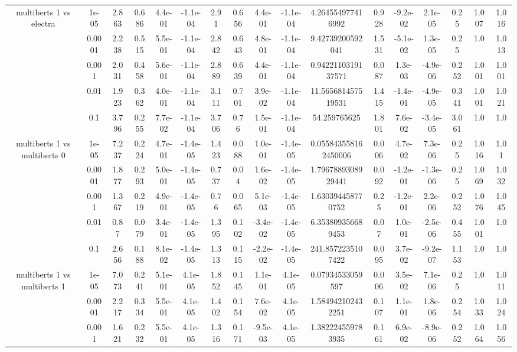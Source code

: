 \begin{tabular}{|c|c|c|c|c|c|c|c|c|c|c|c|c|c|c|c|c|}
\hline
\multirow{5}{*}{multiberts 1 vs electra } & 1e-05 & 2.863 & 0.686 & 4.4e-01 & -1.1e-04 & 2.91 & 0.656 & 4.4e-01 & -1.1e-04 & 4.264554977416992 & 0.928 & -9.2e-02 & 2.1e-05 & 0.25 & 1.007 & 1.016 \\
 & 0.0001 & 2.238 & 0.515 & 5.5e-01 & -1.1e-04 & 2.842 & 0.643 & 4.8e-01 & -1.1e-04 & 9.42739200592041 & 1.531 & -5.1e-02 & 1.3e-05 & 0.25 & 1.0 & 1.013 \\
 & 0.001 & 2.031 & 0.458 & 5.6e-01 & -1.1e-04 & 2.889 & 0.639 & 4.4e-01 & -1.1e-04 & 0.9422110319137571 & 0.087 & 1.3e-03 & -4.9e-06 & 0.252 & 1.001 & 1.001 \\
 & 0.01 & 1.923 & 0.362 & 4.0e-01 & -1.1e-04 & 3.111 & 0.701 & 3.9e-02 & -1.1e-04 & 11.565681457519531 & 1.415 & -1.4e-01 & -4.9e-05 & 0.341 & 1.001 & 1.021 \\
 & 0.1 & 3.796 & 0.255 & 7.7e-02 & -1.1e-04 & 3.706 & 0.76 & 1.5e-01 & -1.1e-04 & 54.259765625 & 1.801 & 7.6e-02 & -3.4e-05 & 3.061 & 1.0 & 1.0 \\
\hline
\multirow{5}{*}{multiberts 1 vs multiberts 0} & 1e-05 & 7.237 & 0.224 & 4.7e-01 & -1.4e-05 & 1.423 & 0.088 & 1.0e-01 & -1.4e-05 & 0.055843558162450006 & 0.006 & 4.7e-02 & 7.3e-06 & 0.25 & 1.016 & 1.01 \\
 & 0.0001 & 1.877 & 0.293 & 5.0e-01 & -1.4e-05 & 0.737 & 0.04 & 1.6e-02 & -1.4e-05 & 1.7967889308929441 & 0.092 & -1.2e-01 & -1.3e-06 & 0.25 & 1.069 & 1.032 \\
 & 0.001 & 1.367 & 0.219 & 4.9e-01 & -1.4e-05 & 0.76 & 0.065 & 5.1e-03 & -1.4e-05 & 1.630394458770752 & 0.25 & -1.2e-01 & 2.2e-06 & 0.252 & 1.076 & 1.045 \\
 & 0.01 & 0.87 & 0.079 & 3.4e-01 & -1.4e-05 & 1.395 & 0.102 & -3.4e-02 & -1.4e-05 & 6.353809356689453 & 0.07 & 1.0e-01 & -2.5e-06 & 0.455 & 1.001 & 1.0 \\
 & 0.1 & 2.656 & 0.188 & 8.1e-02 & -1.4e-05 & 1.313 & 0.115 & -2.2e-02 & -1.4e-05 & 241.8572235107422 & 0.095 & 3.7e-02 & -9.2e-07 & 1.153 & 1.0 & 1.0 \\
\hline
\multirow{5}{*}{multiberts 1 vs multiberts 1} & 1e-05 & 7.073 & 0.241 & 5.1e-01 & 4.1e-05 & 1.852 & 0.145 & 1.1e-01 & 4.1e-05 & 0.07934533059597 & 0.006 & 3.5e-02 & 7.1e-06 & 0.25 & 1.0 & 1.011 \\
 & 0.0001 & 2.217 & 0.334 & 5.5e-01 & 4.1e-05 & 1.402 & 0.154 & 7.6e-02 & 4.1e-05 & 1.584942102432251 & 0.107 & 1.1e-01 & 1.8e-06 & 0.254 & 1.033 & 1.024 \\
 & 0.001 & 1.621 & 0.232 & 5.5e-01 & 4.1e-05 & 1.316 & 0.171 & -9.5e-03 & 4.1e-05 & 1.382224559783935 & 0.161 & 6.9e-02 & -8.9e-06 & 0.252 & 1.064 & 1.056 \\

\end{tabular}
